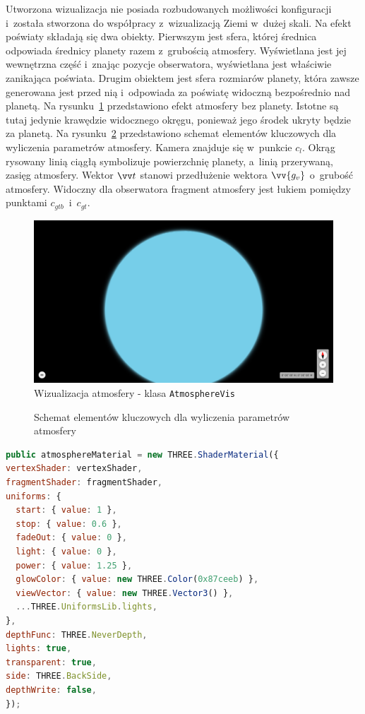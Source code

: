 Utworzona wizualizacja nie posiada rozbudowanych możliwości konfiguracji i~została stworzona do współpracy z~wizualizacją Ziemi w~dużej skali. Na efekt poświaty składają się dwa obiekty. Pierwszym jest sfera, której średnica odpowiada średnicy planety razem z~grubością atmosfery. Wyświetlana jest jej wewnętrzna część i~znając pozycje obserwatora, wyświetlana jest właściwie zanikająca poświata. Drugim obiektem jest sfera rozmiarów planety, która zawsze generowana jest przed nią i~odpowiada za poświatę widoczną bezpośrednio nad planetą. Na rysunku~\ref{fig:c4_atmosphereVis} przedstawiono efekt atmosfery bez planety. Istotne są tutaj jedynie krawędzie widocznego okręgu, ponieważ jego środek ukryty będzie za planetą. Na rysunku~\ref{fig:atmosphere} przedstawiono schemat elementów kluczowych dla wyliczenia parametrów atmosfery. Kamera znajduje się w~punkcie $c_l$. Okrąg rysowany linią ciągłą symbolizuje powierzchnię planety, a~linią przerywaną, zasięg atmosfery. Wektor $\vv t$ stanowi przedłużenie wektora $\vv{g_v}$ o~grubość atmosfery. Widoczny dla obserwatora fragment atmosfery jest łukiem pomiędzy punktami $c_{gtb}$~i~$c_{gt}$.

\begin{figure}
\centering
\includegraphics[width=\linewidth]{img/c4_atmosphereVis.png}
\caption{Wizualizacja atmosfery - klasa \texttt{AtmosphereVis}}
\label{fig:c4_atmosphereVis} 
\end{figure}

\begin{figure}[h]
\centering

\caption{Schemat elementów kluczowych dla wyliczenia parametrów atmosfery}
\label{fig:atmosphere}
\end{figure}

\begin{lstlisting}[float, language=javascript, label={lst:atmosphereVis}, caption={
Fragmenty klasy \texttt{AtmosphereVis}}
]
public atmosphereMaterial = new THREE.ShaderMaterial({
vertexShader: vertexShader,
fragmentShader: fragmentShader,
uniforms: {
  start: { value: 1 },
  stop: { value: 0.6 },
  fadeOut: { value: 0 },
  light: { value: 0 },
  power: { value: 1.25 },
  glowColor: { value: new THREE.Color(0x87ceeb) },
  viewVector: { value: new THREE.Vector3() },
  ...THREE.UniformsLib.lights,
},
depthFunc: THREE.NeverDepth,
lights: true,
transparent: true,
side: THREE.BackSide,
depthWrite: false,
});
\end{lstlisting}

